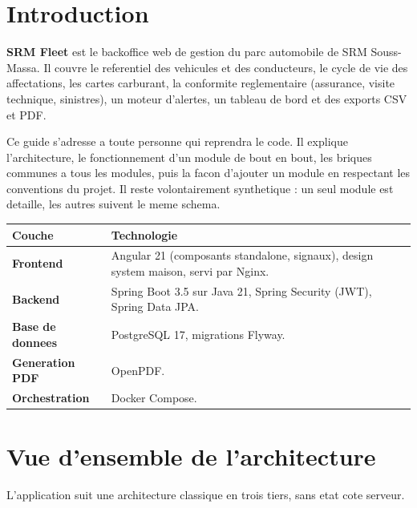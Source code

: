 \documentclass[11pt]{article}
\begin{document}

\tableofcontents
\vspace{0.6cm}
\srmrule
\vspace{0.4cm}

\section{Introduction}
\textbf{SRM Fleet} est le backoffice web de gestion du parc automobile de SRM Souss-Massa. Il couvre
le referentiel des vehicules et des conducteurs, le cycle de vie des affectations, les cartes
carburant, la conformite reglementaire (assurance, visite technique, sinistres), un moteur d'alertes,
un tableau de bord et des exports CSV et PDF.

Ce guide s'adresse a toute personne qui reprendra le code. Il explique l'architecture, le
fonctionnement d'un module de bout en bout, les briques communes a tous les modules, puis la facon
d'ajouter un module en respectant les conventions du projet. Il reste volontairement synthetique :
un seul module est detaille, les autres suivent le meme schema.

\begin{center}
\renewcommand{\arraystretch}{1.3}
\begin{tabularx}{\linewidth}{>{\bfseries}l Y}
\toprule
{} Couche & Technologie \\
\midrule
Frontend & Angular 21 (composants standalone, signaux), design system maison, servi par Nginx. \\
Backend  & Spring Boot 3.5 sur Java 21, Spring Security (JWT), Spring Data JPA. \\
Base de donnees & PostgreSQL 17, migrations Flyway. \\
Generation PDF & OpenPDF. \\
Orchestration & Docker Compose. \\
\bottomrule
\end{tabularx}
\end{center}

\section{Vue d'ensemble de l'architecture}
L'application suit une architecture classique en trois tiers, sans etat cote serveur.
\end{document}
